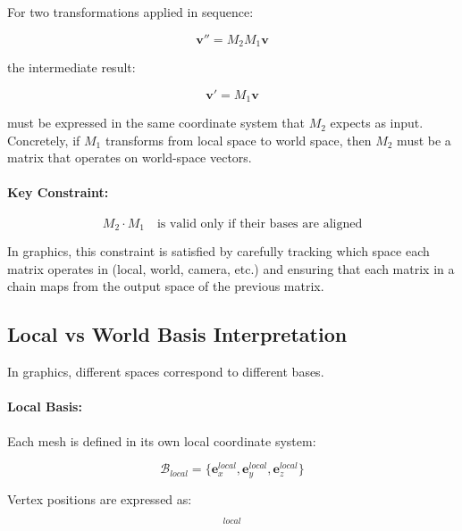 \documentclass[11pt]{article}
\begin{document}
For two transformations applied in sequence:

\begin{equation}
    \mathbf{v}'' = M_2 M_1 \mathbf{v}
\end{equation}

the intermediate result:

\begin{equation}
    \mathbf{v}' = M_1 \mathbf{v}
\end{equation}

must be expressed in the same coordinate system that $M_2$ expects as input. Concretely, if $M_1$ transforms from local space to world space, then $M_2$ must be a matrix that operates on world-space vectors.

\paragraph{Key Constraint:}

\begin{equation}
    M_2 \cdot M_1 \quad \text{is valid only if their bases are aligned}
\end{equation}

In graphics, this constraint is satisfied by carefully tracking which space each matrix operates in (local, world, camera, etc.) and ensuring that each matrix in a chain maps from the output space of the previous matrix.

\subsection{Local vs World Basis Interpretation}

In graphics, different spaces correspond to different bases.

\paragraph{Local Basis:}

Each mesh is defined in its own local coordinate system:

\begin{equation}
    \mathcal{B}_{local} =
    \{\mathbf{e}_x^{local}, \mathbf{e}_y^{local}, \mathbf{e}_z^{local}\}
\end{equation}

Vertex positions are expressed as:

\begin{equation}
    [\mathbf{v}]_{local}
\end{equation}
\end{document}
